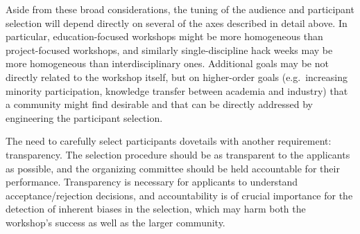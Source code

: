Aside from these broad considerations, the tuning of the audience and participant selection will depend directly on several of the axes described in detail above.
In particular, education-focused workshops might be more homogeneous than project-focused workshops, and similarly single-discipline hack weeks may be more homogeneous than interdisciplinary ones.
Additional goals may be not directly related to the workshop itself, but on higher-order goals (e.g.\ increasing minority participation, knowledge transfer between academia and industry) that a community might find desirable and that can be directly addressed by engineering the participant selection.

The need to carefully select participants dovetails with another requirement: transparency.
The selection procedure should be as transparent to the applicants as possible, and the organizing committee should be held accountable for their performance.
Transparency is necessary for applicants to understand acceptance/rejection decisions, and accountability is of crucial importance for the detection of inherent biases in the selection, which may harm both the workshop's success as well as the larger community.

